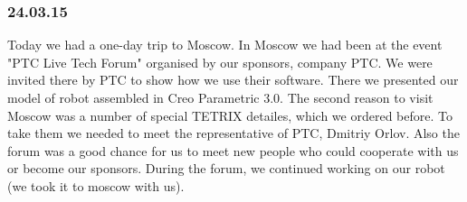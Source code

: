 \subsubsection{24.03.15}

Today we had a one-day trip to Moscow. In Moscow we had been at the event "PTC Live Tech Forum" organised by our sponsors, company PTC. We were invited there by PTC to show how we use their software. There we presented our model of robot assembled in Creo Parametric 3.0.\newline
The second reason to visit Moscow was a number of special TETRIX detailes, which we ordered before. To take them we needed to meet the representative of PTC, Dmitriy Orlov.\newline
Also the forum was a good chance for us to meet new people who could cooperate with us or become our sponsors.\newline
During the forum, we continued working on our robot (we took it to moscow with us).

